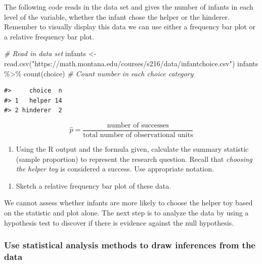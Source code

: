 \documentclass[
]{report}
\newenvironment{Shaded}{\begin{snugshade}}{\end{snugshade}}
\newcommand{\CommentTok}[1]{\textcolor[rgb]{0.56,0.35,0.01}{\textit{#1}}}
\newcommand{\FunctionTok}[1]{\textcolor[rgb]{0.00,0.00,0.00}{#1}}
\newcommand{\NormalTok}[1]{#1}
\newcommand{\OtherTok}[1]{\textcolor[rgb]{0.56,0.35,0.01}{#1}}
\newcommand{\SpecialCharTok}[1]{\textcolor[rgb]{0.00,0.00,0.00}{#1}}
\newcommand{\StringTok}[1]{\textcolor[rgb]{0.31,0.60,0.02}{#1}}
\providecommand{\tightlist}{%
  \setlength{\itemsep}{0pt}\setlength{\parskip}{0pt}}
\begin{document}
The following code reads in the data set and gives the number of infants in each level of the variable, whether the infant chose the helper or the hinderer. Remember to visually display this data we can use either a frequency bar plot or a relative frequency bar plot.

\begin{Shaded}
\begin{Highlighting}[]
 \CommentTok{\# Read in data set}
\NormalTok{infants }\OtherTok{\textless{}{-}} \FunctionTok{read.csv}\NormalTok{(}\StringTok{"https://math.montana.edu/courses/s216/data/infantchoice.csv"}\NormalTok{)}
\NormalTok{infants }\SpecialCharTok{\%\textgreater{}\%} \FunctionTok{count}\NormalTok{(choice)  }\CommentTok{\# Count number in each choice category}
\end{Highlighting}
\end{Shaded}

\begin{verbatim}
#>     choice  n
#> 1   helper 14
#> 2 hinderer  2
\end{verbatim}

\[\hat{p} = \frac{\mbox{number of successes}}{\mbox{total number of observational units}}\]
\newpage

\begin{enumerate}
\def\labelenumi{\arabic{enumi}.}
\setcounter{enumi}{2}
\tightlist
\item
  Using the R output and the formula given, calculate the summary statistic (sample proportion) to represent the research question. Recall that \emph{choosing the helper toy} is considered a success. Use appropriate notation.
\end{enumerate}

\vspace{0.5in}

\begin{enumerate}
\def\labelenumi{\arabic{enumi}.}
\setcounter{enumi}{3}
\tightlist
\item
  Sketch a relative frequency bar plot of these data.
\end{enumerate}

\vspace{1.5in}

We cannot assess whether infants are more likely to choose the helper toy based on the statistic and plot alone. The next step is to analyze the data by using a hypothesis test to discover if there is evidence against the null hypothesis.

\hypertarget{use-statistical-analysis-methods-to-draw-inferences-from-the-data}{%
\subsubsection*{Use statistical analysis methods to draw inferences from the data}\label{use-statistical-analysis-methods-to-draw-inferences-from-the-data}}
\end{document}
